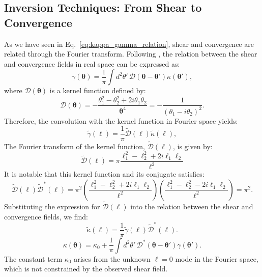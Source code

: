 \subsection[From Shear to Convergence]{Inversion Techniques: From Shear to Convergence}
As we have seen in Eq.~\eqref{eq:kappa_gamma_relation}, shear and convergence are related through the Fourier transform. Following \citet{1993ApJ...404..441K}, the relation between the shear and convergence fields in real space can be expressed as:
\begin{equation}
    \gamma(\boldsymbol{\theta}) = \frac{1}{\pi} \int d^2\theta' \, \mathcal{D}(\boldsymbol{\theta} - \boldsymbol{\theta'}) \kappa(\boldsymbol{\theta'}),
\end{equation}
where $\mathcal{D}(\boldsymbol{\theta})$ is a kernel function defined by:
\begin{equation}
    \mathcal{D}(\boldsymbol{\theta}) = - \frac{\theta_1^2 - \theta_2^2 + 2i\theta_1\theta_2}{\boldsymbol{\theta}^4} = - \frac{1}{(\theta_1 - i\theta_2)^2}.
\end{equation}
Therefore, the convolution with the kernel function in Fourier space yields:
\begin{equation}
    \tilde{\gamma}(\boldsymbol{\ell}) = \frac{1}{\pi}\tilde{\mathcal{D}}(\boldsymbol{\ell}) \tilde{\kappa}(\boldsymbol{\ell}),
\end{equation}
The Fourier transform of the kernel function,  $\tilde{\mathcal{D}}(\boldsymbol{\ell})$, is given by:
\begin{equation}
    \tilde{\mathcal{D}}(\boldsymbol{\ell}) = \pi \frac{\ell_1^2 - \ell_2^2 + 2i\ell_1\ell_2}{\ell^2} 
\end{equation}
It is notable that this kernel function and its conjugate satisfies:
\begin{equation}
    \tilde{\mathcal{D}}(\boldsymbol{\ell})\tilde{\mathcal{D}}^*(\boldsymbol{\ell}) = \pi^2 \left(\frac{\ell_1^2 - \ell_2^2 + 2i\ell_1\ell_2}{\ell^2}\right)\left(\frac{\ell_1^2 - \ell_2^2 - 2i\ell_1\ell_2}{\ell^2}\right) = \pi^2.
\end{equation}
Substituting the expression for $\tilde{\mathcal{D}}(\boldsymbol{\ell})$ into the relation between the shear and convergence fields, we find:
\begin{equation}
    \tilde{\kappa}(\boldsymbol{\ell}) = \frac{1}{\pi}\tilde{\gamma}(\boldsymbol{\ell}) \tilde{\mathcal{D}}^*(\boldsymbol{\ell}).
\end{equation}
\begin{equation}
    \kappa(\boldsymbol{\theta}) = \kappa_0 + \frac{1}{\pi} \int d^2\theta' \, \mathcal{D}^*(\boldsymbol{\theta} - \boldsymbol{\theta'}) \gamma(\boldsymbol{\theta'}).
\end{equation}
The constant term $\kappa_0$ arises from the unknown $\ell = 0$ mode in the Fourier space, which is not constrained by the observed shear field.

